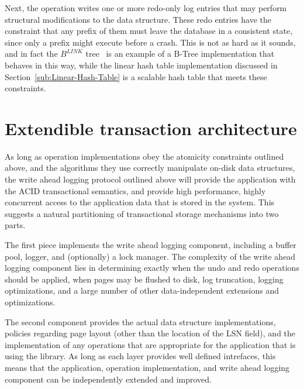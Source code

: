 \documentclass[letterpaper,english]{article}
\begin{document}
Next, the operation writes one or more redo-only log entries that may perform structural
modifications to the data structure. These redo entries have the constraint that any prefix of them must leave the database in a consistent state, since only a prefix might execute before a crash.  This is not as hard as it sounds, and in fact the
$B^{LINK}$ tree~\cite{blink} is an example of a B-Tree implementation
that behaves in this way, while the linear hash table implementation
discussed in Section~\ref{sub:Linear-Hash-Table} is a scalable 
hash table that meets these constraints.


\section{Extendible transaction architecture}

As long as operation implementations obey the atomicity constraints
outlined above, and the algorithms they use correctly manipulate
on-disk data structures, the write ahead logging protocol outlined
above will provide the application with the ACID transactional
semantics, and provide high performance, highly concurrent access to
the application data that is stored in the system.  This suggests a
natural partitioning of transactional storage mechanisms into two
parts.  

The first piece implements the write ahead logging component,
including a buffer pool, logger, and (optionally) a lock manager.  
The complexity of the write ahead logging component lies in
determining exactly when the undo and redo operations should be
applied, when pages may be flushed to disk, log truncation, logging
optimizations, and a large number of other data-independent extensions
and optimizations.

The second component provides the actual data structure
implementations, policies regarding page layout (other than the
location of the LSN field), and the implementation of any operations
that are appropriate for the application that is using the library.
As long as each layer provides well defined intrefaces, this means
that the application, operation implementation, and write ahead
logging component can be independently extended and improved.
\end{document}
